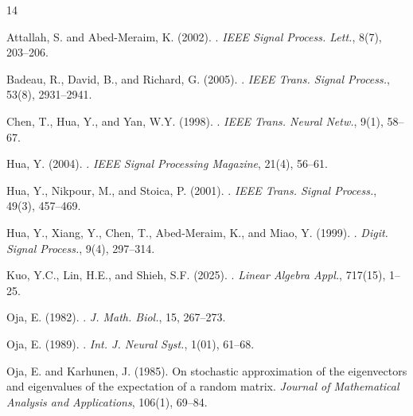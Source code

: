 \documentclass{ifacconf}
\begin{document}
                  
\begin{thebibliography}{14}

Attallah, S. and Abed-Meraim, K. (2002).
.
\newblock \emph{IEEE Signal Process. Lett.}, 8(7), 203--206.

Badeau, R., David, B., and Richard, G. (2005).
.
\newblock \emph{IEEE Trans. Signal Process.}, 53(8), 2931--2941.

Chen, T., Hua, Y., and Yan, W.Y. (1998).
.
\newblock \emph{IEEE Trans. Neural Netw.}, 9(1), 58--67.

Hua, Y. (2004).
.
\newblock \emph{IEEE Signal Processing Magazine}, 21(4), 56--61.

Hua, Y., Nikpour, M., and Stoica, P. (2001).
.
\newblock \emph{IEEE Trans. Signal Process.}, 49(3), 457--469.

Hua, Y., Xiang, Y., Chen, T., Abed-Meraim, K., and Miao, Y. (1999).
.
\newblock \emph{Digit. Signal Process.}, 9(4), 297--314.

Kuo, Y.C., Lin, H.E., and Shieh, S.F. (2025).
.
\newblock \emph{Linear Algebra Appl.}, 717(15), 1--25.

Oja, E. (1982).
.
\newblock \emph{J. Math. Biol.}, 15, 267--273.

Oja, E. (1989).
.
\newblock \emph{Int. J. Neural Syst.}, 1(01), 61--68.

Oja, E. and Karhunen, J. (1985).
\newblock On stochastic approximation of the eigenvectors and eigenvalues of
  the expectation of a random matrix.
\newblock \emph{Journal of Mathematical Analysis and Applications}, 106(1),
  69--84.


\end{thebibliography}
\end{document}
